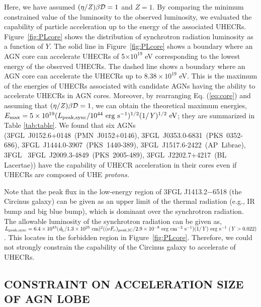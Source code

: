 \documentclass{aastex6}
\begin{document}
\noindent Here, we have assumed $(\eta/{\it Z})\beta \cal{D}\rm{} = 1$ and $Z =1$. 
By comparing the minimum constrained value of the luminosity to the observed luminosity, we evaluated the capability of particle acceleration up to the energy of the associated UHECRs.
Figure~\ref{fig:PLcore} shows the distribution of synchrotron radiation luminosity as a function of $Y$.
The solid line in Figure~\ref{fig:PLcore} shows a boundary where an AGN core can accelerate UHECRs of 5$\times10^{19}$ eV corresponding to the lowest energy of the observed UHECRs.
The dashed line shows a boundary where an AGN core can accelerate the UHECRs up to $8.38\times10^{19}$ eV.
This is the maximum of the energies of UHECRs associated with candidate AGNs having the ability to accelerate UHECRs in AGN cores.
Moreover, by rearranging Eq. (\ref{eq:core}) and assuming that $(\eta/{\it Z})\beta \cal{D}\rm{} = 1$, we can obtain the theoretical maximum energies, $E_{\rm{max}} = 5\times10^{19}(L_{\rm{peak,sync}}/10^{44}~\rm{erg~s^{-1}})^{1/2}(1/\it{Y}\rm{})^{1/2}~\rm{eV}$; they are summarized in Table \ref{tab:table}.
We found that six AGNs (3FGL~J0152.6+0148~(PMN~J0152+0146), 3FGL~J0353.0-6831~(PKS~0352-686), 3FGL~J1444.0-3907~(PKS~1440-389), 3FGL~J1517.6-2422~(AP~Librae), 3FGL~ 3FGL~J2009.3-4849~(PKS~2005-489), 3FGL~J2202.7+4217~(BL Lacertae)) have the capability of UHECR acceleration in their cores even if UHECRs are composed of UHE \it{protons}\rm{}.

Note that the peak flux in the low-energy region of 3FGL J1413.2$-$6518 (the Circinus galaxy)  can be given as an upper limit of the thermal radiation (e.g., IR bump and big blue bump), which is dominant over the synchrotron radiation.
The allowable luminosity of the synchrotron radiation can be given as, $L_{\rm peak, sync} = 6.4\times10^{43}(\it{d}_{\rm{L}}/\rm{1.3 \times 10^{25}~cm)^{2}}((\it{\nu F_{\nu}})_{\rm{peak,IC}}/\rm{2.9 \times 10^{-8}~erg~cm^{-2}~s^{-1}} )(1/\it{Y})~\rm{erg~s^{-1}}~(\it{Y}\rm{}>0.022)$.
This locates in the forbidden region in Figure~\ref{fig:PLcore}.
Therefore, we could not strongly constrain the capability of the Circinus galaxy to accelerate of UHECRs.

\subsection{CONSTRAINT ON ACCELERATION SIZE OF AGN LOBE}
\label{sec:lobe}
\end{document}
